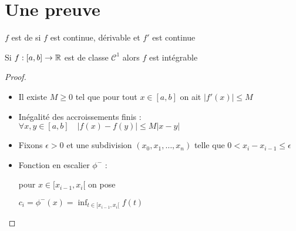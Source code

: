 \section*{Une preuve}


\begin{frame}
$f$ est de  si $f$ est continue, dérivable et $f'$ est continue

\pause

\begin{theoreme}
\label{th:c1integrable}
Si $f : [a,b] \to \mathbb{R}$ est de classe $\mathcal{C}^1$ alors $f$ est intégrable 
\end{theoreme}

\pause

\begin{proof}
\begin{itemize}
  \item Il existe $M\ge 0$ tel que pour tout $x \in [a,b]$ on ait $|f'(x)|\le M$
\pause
  \item Inégalité des accroissements finis : $\forall x,y \in [a,b] \quad |f(x)-f(y)| \le M |x-y|$
\pause
  \item Fixons $\epsilon>0$ et une subdivision $(x_0,x_1,\ldots,x_n)$ telle que $0 < x_i-x_{i-1} \le \epsilon$
\pause
  \item Fonction en escalier $\phi^-$ : 

pour  $x\in[x_{i-1},x_i[$ on pose 

$c_i = \phi^-(x)= \inf_{t\in [x_{i-1},x_i[} f(t)$

\uncover<8->{
  \item  $\phi^+$ : $d_i = \phi^+(x)= \sup_{t\in [x_{i-1},x_i[} f(t)$
}
\end{itemize}

\vspace*{-22mm}
\hfill
\begin{minipage}{0.4\textwidth}
\end{minipage}
\vspace*{-5mm}

\end{proof}

\end{frame}




